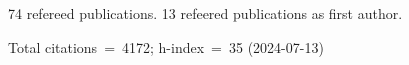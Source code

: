 74 refereed publications. 13 refeered publications as first author.

Total citations~=~4172; h-index~=~35 (2024-07-13)